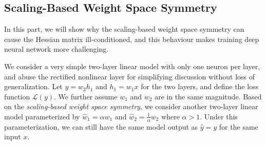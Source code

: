 \documentclass[twocolumn]{article}
\begin{document}
\subsection{Scaling-Based Weight Space Symmetry}
In this part, we will  show why the scaling-based weight space symmetry can cause the Hessian matrix ill-conditioned, and this behaviour makes training deep neural network more challenging.



We consider a very simple two-layer linear model with only one neuron per layer, and abuse the rectified nonlinear layer for simplifying discussion without loss of generalization. Let $y=w_2 h_1$ and $h_1=w_1 x$ for the two layers, and define the loss function $\mathcal{L}(y)$. We further assume $w_1$ and $w_2$ are in the same magnitude. Based on the \emph{scaling-based weight space symmetry}, we consider another two-layer linear model parameterized by $ \hat{w}_1= \alpha w_1$ and $\hat{w}_2= \frac{1}{\alpha} w_2$ where $\alpha>1$. Under this parameterization, we can still have the same model output as $\hat{y}=y$ for the same input $x$.
\end{document}
